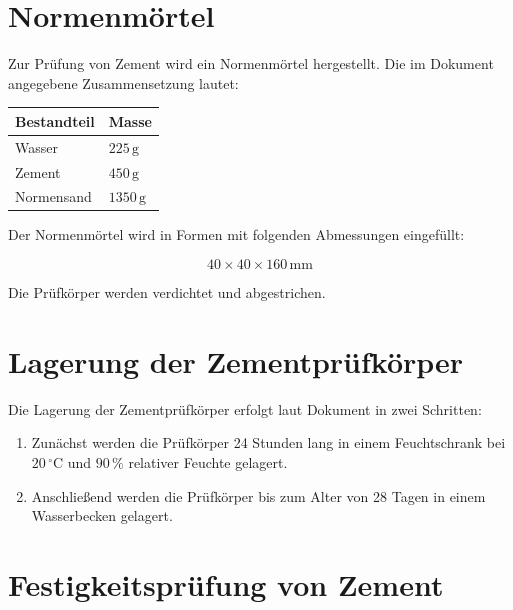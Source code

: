 \documentclass[
  12pt,
  a4paper,
  oneside
]{scrreprt}
\begin{document}
\section{Normenmörtel}

Zur Prüfung von Zement wird ein Normenmörtel hergestellt. Die im
Dokument angegebene Zusammensetzung lautet:

\begin{longtable}{
  >{\raggedright\arraybackslash}p{}
  >{\centering\arraybackslash}p{}
}
\toprule
\textbf{Bestandteil} &
\textbf{Masse} \\
\midrule
\endhead

Wasser &
$225\,\mathrm{g}$ \\

Zement &
$450\,\mathrm{g}$ \\

Normensand &
$1350\,\mathrm{g}$ \\

\bottomrule
\end{longtable}



Der Normenmörtel wird in Formen mit folgenden Abmessungen eingefüllt:

\begin{equation}
  40 \times 40 \times 160\,\mathrm{mm}
\end{equation}

Die Prüfkörper werden verdichtet und abgestrichen. 

\section{Lagerung der Zementprüfkörper}

Die Lagerung der Zementprüfkörper erfolgt laut Dokument in zwei
Schritten:

\begin{enumerate}
  \item Zunächst werden die Prüfkörper 24 Stunden lang in einem
  Feuchtschrank bei $20\,^\circ\mathrm{C}$ und $90\,\%$ relativer
  Feuchte gelagert.

  \item Anschließend werden die Prüfkörper bis zum Alter von 28 Tagen
  in einem Wasserbecken gelagert.
\end{enumerate}



\section{Festigkeitsprüfung von Zement}
\end{document}
